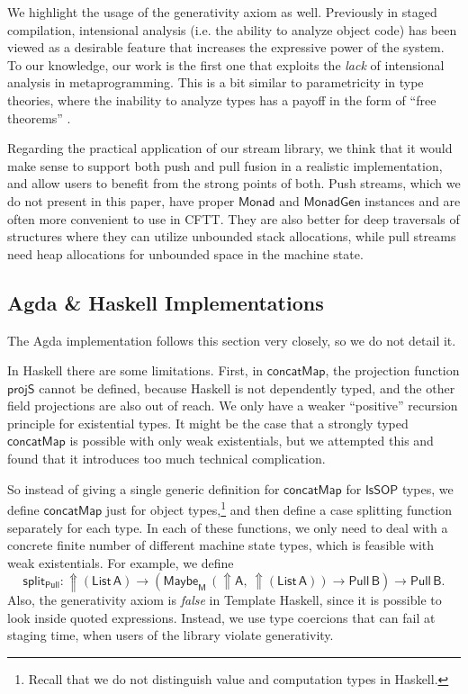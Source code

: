 \documentclass[acmsmall,screen,review,anonymous]{acmart}
\newcommand{\mit}[1]{{\mathsf{#1}}}
\newcommand{\msf}[1]{{\mathsf{#1}}}
\newcommand{\M}{\msf{M}}
\newcommand{\vA}{\mathsf{A}}
\newcommand{\vB}{\mathsf{B}}
\newcommand{\IsSOP}{\msf{IsSOP}}
\newcommand{\List}{\msf{List}}
\newcommand{\Monad}{\msf{Monad}}
\newcommand{\concatMap}{\msf{concatMap}}
\newcommand{\Lift}{{\Uparrow}}
\newcommand{\Maybe}{\msf{Maybe}}
\theoremstyle{remark}
\newcommand{\MonadGen}{\msf{MonadGen}}
\newcommand{\Pull}{\msf{Pull}}
\begin{document}
We highlight the usage of the generativity axiom as well. Previously in staged
compilation, intensional analysis (i.e. the ability to analyze object code) has
been viewed as a desirable feature that increases the expressive power of the
system. To our knowledge, our work is the first one that exploits the
\emph{lack} of intensional analysis in metaprogramming. This is a bit similar to
parametricity in type theories, where the inability to analyze types has a
payoff in the form of ``free theorems'' \cite{TODO}.

Regarding the practical application of our stream library, we think that it
would make sense to support both push and pull fusion in a realistic
implementation, and allow users to benefit from the strong points of both. Push
streams, which we do not present in this paper, have proper $\Monad$ and
$\MonadGen$ instances and are often more convenient to use in CFTT. They are
also better for deep traversals of structures where they can utilize unbounded
stack allocations, while pull streams need heap allocations for unbounded space
in the machine state.

\subsection{Agda \& Haskell Implementations}

The Agda implementation follows this section very closely, so we do not detail it.

In Haskell there are some limitations. First, in $\concatMap$, the
projection function $\mit{projS}$ cannot be defined, because Haskell is not
dependently typed, and the other field projections are also out of reach. We
only have a weaker ``positive'' recursion principle for existential types. It
might be the case that a strongly typed $\concatMap$ is possible with only weak
existentials, but we attempted this and found that it introduces too much
technical complication.

So instead of giving a single generic definition for $\concatMap$ for $\IsSOP$
types, we define $\concatMap$ just for object types,\footnote{Recall that we do
not distinguish value and computation types in Haskell.} and then define a case
splitting function separately for each type. In each of these functions, we only
need to deal with a concrete finite number of different machine state types,
which is feasible with weak existentials. For example, we define
\[ \mit{split_{\Pull}} : \Lift (\List\,\vA) \to (\Maybe_\M\,(\Lift \vA,\,\Lift (\List\,\vA)) \to \Pull\,\vB) \to \Pull\,\vB. \]
Also, the generativity axiom is \emph{false} in Template Haskell, since it is
possible to look inside quoted expressions. Instead, we use type coercions that
can fail at staging time, when users of the library violate generativity.




\end{document}
